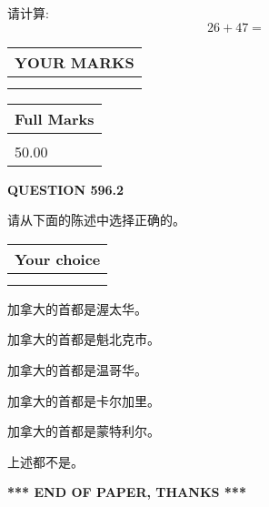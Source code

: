 \documentclass{ctexart}
\begin{document}
  
 
请计算:
\begin{equation}
26 +  %
47 = \nonumber
\end{equation}
 

 

 
  
\vspace{0.2in}
  
\noindent\begin{tabular}{|l|}
\hline
 YOUR MARKS  \\
\hline
 \\ 
 \\ 
\hline
\end{tabular}
\hspace{0.05in} \begin{tabular}{|l|}
\hline
 Full Marks  \\
\hline
 \\ 
50.00 \\
\hline
\end{tabular}
{\textbf{\Large{QUESTION
596.2 
}}}
  
  
请从下面的陈述中选择正确的。
  
  
\noindent\hspace{3.0in} \begin{tabular}{|l|}
\hline
Your choice \\
\hline
 \\ 
 \\ 
\hline
\end{tabular}
  
  
 
 
加拿大的首都是渥太华。
 
 
加拿大的首都是魁北克市。
 
 
加拿大的首都是温哥华。
 
 
加拿大的首都是卡尔加里。
 
 
加拿大的首都是蒙特利尔。
 
 
 上述都不是。
 
 
   
   
 \vspace{0.2in}
 
   
   
   
   
\vspace{1.0in} 
{\textbf{\large{ *** END OF PAPER, THANKS *** }}} 
   
\end{document}

